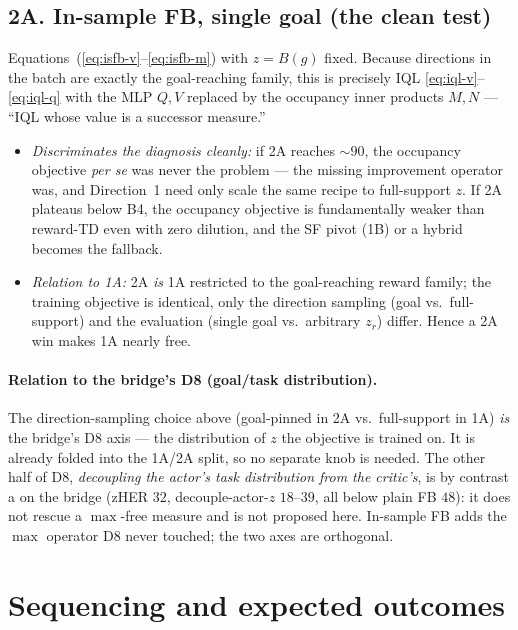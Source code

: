 \documentclass[11pt]{article}
\newcommand{\Bmap}{B}                                %
\begin{document}
\subsection*{2A. In-sample FB, single goal (the clean test)}
Equations~(\ref{eq:isfb-v}--\ref{eq:isfb-m}) with $z=\Bmap(g)$ fixed. Because
directions in the batch are exactly the goal-reaching family, this is precisely
IQL \eqref{eq:iql-v}--\eqref{eq:iql-q} with the MLP $Q,V$ replaced by the
occupancy inner products $M,N$ --- ``IQL whose value is a successor measure.''
\begin{itemize}[leftmargin=1.4em,itemsep=1pt]
  \item \emph{Discriminates the diagnosis cleanly:} if 2A reaches ${\sim}90$, the
        occupancy objective \emph{per se} was never the problem --- the missing
        improvement operator was, and Direction~1 need only scale the same recipe
        to full-support $z$. If 2A plateaus below B4, the occupancy objective is
        fundamentally weaker than reward-TD even with zero dilution, and the SF
        pivot (1B) or a hybrid becomes the fallback.
  \item \emph{Relation to 1A:} 2A \emph{is} 1A restricted to the goal-reaching
        reward family; the training objective is identical, only the direction
        sampling (goal vs.\ full-support) and the evaluation (single goal vs.\
        arbitrary $z_r$) differ. Hence a 2A win makes 1A nearly free.
\end{itemize}

\paragraph{Relation to the bridge's D8 (goal/task distribution).} The
direction-sampling choice above (goal-pinned in 2A vs.\ full-support in 1A) \emph{is}
the bridge's D8 axis --- the distribution of $z$ the objective is trained on. It is
already folded into the 1A/2A split, so no separate knob is needed. The other half of
D8, \emph{decoupling the actor's task distribution from the critic's}, is by contrast
a \B{closed negative} on the bridge (zHER $32$, decouple-actor-$z$ $18$--$39$, all
below plain FB $48$): it does not rescue a $\max$-free measure and is not proposed
here. In-sample FB adds the $\max$ operator D8 never touched; the two axes are
orthogonal.

\section{Sequencing and expected outcomes}
\end{document}
